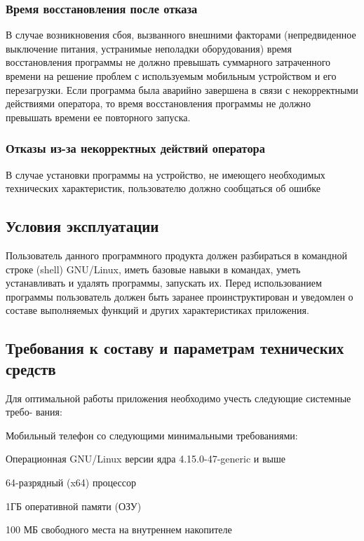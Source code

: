 \subsubsection{Время восстановления после отказа}
В случае возникновения сбоя, вызванного внешними факторами (непредвиденное
выключение питания, устранимые неполадки оборудования) время восстановления
программы не должно превышать суммарного затраченного времени на решение
проблем с используемым мобильным устройством и его перезагрузки. Если программа
была аварийно завершена в связи с некорректными действиями оператора, то время
восстановления программы не должно превышать времени ее повторного запуска.

\subsubsection{Отказы из-за некорректных действий оператора}
В случае установки программы на устройство, не имеющего необходимых технических
характеристик, пользователю должно сообщаться об ошибке

\subsection{Условия эксплуатации}
Пользователь данного программного продукта должен разбираться в командной
строке (shell) GNU/Linux, иметь базовые навыки в командах, уметь устанавливать
и удалять программы, запускать их. Перед использованием программы
пользователь должен быть заранее проинструктирован и уведомлен о составе
выполняемых функций и других характеристиках приложения.

\subsection{Требования к составу и параметрам технических средств}
Для оптимальной работы приложения необходимо учесть следующие системные требо-
вания:
\begin{my_enumerate}
    \item Мобильный телефон со следующими минимальными требованиями:
        \begin{my_enumerate}
            \item Операционная GNU/Linux версии ядра 4.15.0-47-generic и выше
            \item 64-разрядный (x64) процессор
            \item 1ГБ оперативной памяти (ОЗУ)
            \item 100 МБ свободного места на внутреннем накопителе
        \end{my_enumerate}
\end{my_enumerate}


